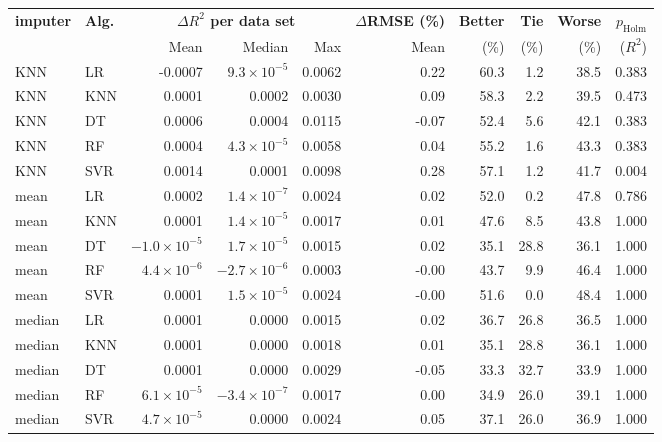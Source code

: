 \begin{tabular}{llrrrrrrrr}
\toprule
\textbf{imputer} & \textbf{Alg.} & \multicolumn{3}{c}{\textbf{$\Delta R^2$ per data set}} & \textbf{$\Delta$RMSE (\%)} & \textbf{Better} & \textbf{Tie} & \textbf{Worse} & \textbf{$p_{\text{Holm}}$} \\
\cmidrule(lr){3-5}
& & Mean & Median & Max & Mean & (\%) & (\%) & (\%) & ($R^2$) \\
\midrule
KNN & LR & -0.0007 & $9.3\times10^{-5}$ & 0.0062 & 0.22 & 60.3 & 1.2 & 38.5 & 0.383 \\
KNN & KNN & 0.0001 & 0.0002 & 0.0030 & 0.09 & 58.3 & 2.2 & 39.5 & 0.473 \\
KNN & DT & 0.0006 & 0.0004 & 0.0115 & -0.07 & 52.4 & 5.6 & 42.1 & 0.383 \\
KNN & RF & 0.0004 & $4.3\times10^{-5}$ & 0.0058 & 0.04 & 55.2 & 1.6 & 43.3 & 0.383 \\
KNN & SVR & 0.0014 & 0.0001 & 0.0098 & 0.28 & 57.1 & 1.2 & 41.7 & 0.004 \\
\midrule
mean & LR & 0.0002 & $1.4\times10^{-7}$ & 0.0024 & 0.02 & 52.0 & 0.2 & 47.8 & 0.786 \\
mean & KNN & 0.0001 & $1.4\times10^{-5}$ & 0.0017 & 0.01 & 47.6 & 8.5 & 43.8 & 1.000 \\
mean & DT & $-1.0\times10^{-5}$ & $1.7\times10^{-5}$ & 0.0015 & 0.02 & 35.1 & 28.8 & 36.1 & 1.000 \\
mean & RF & $4.4\times10^{-6}$ & $-2.7\times10^{-6}$ & 0.0003 & -0.00 & 43.7 & 9.9 & 46.4 & 1.000 \\
mean & SVR & 0.0001 & $1.5\times10^{-5}$ & 0.0024 & -0.00 & 51.6 & 0.0 & 48.4 & 1.000 \\
\midrule
median & LR & 0.0001 & 0.0000 & 0.0015 & 0.02 & 36.7 & 26.8 & 36.5 & 1.000 \\
median & KNN & 0.0001 & 0.0000 & 0.0018 & 0.01 & 35.1 & 28.8 & 36.1 & 1.000 \\
median & DT & 0.0001 & 0.0000 & 0.0029 & -0.05 & 33.3 & 32.7 & 33.9 & 1.000 \\
median & RF & $6.1\times10^{-5}$ & $-3.4\times10^{-7}$ & 0.0017 & 0.00 & 34.9 & 26.0 & 39.1 & 1.000 \\
median & SVR & $4.7\times10^{-5}$ & 0.0000 & 0.0024 & 0.05 & 37.1 & 26.0 & 36.9 & 1.000 \\
\bottomrule
\end{tabular}
